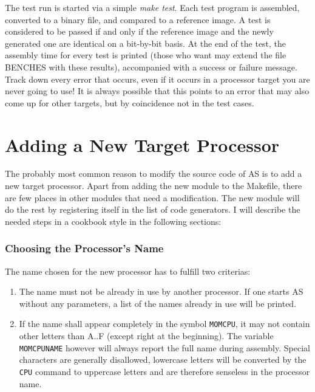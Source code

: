 \documentclass[12pt,twoside]{report}
\newcommand{\tty}[1]{{\tt #1}}
\newcommand{\asname}{{AS}}
\begin{document}
The test run is started via a simple {\em make test}.  Each test program
is assembled, converted to a binary file, and compared to a reference
image.  A test is considered to be passed if and only if the reference
image and the newly generated one are identical on a bit-by-bit basis.  At
the end of the test, the assembly time for every test is printed (those
who want may extend the file BENCHES with these results), accompanied with
a success or failure message.  Track down every error that occurs, even if
it occurs in a processor target you are never going to use!  It is always
possible that this points to an error that may also come up for other
targets, but by coincidence not in the test cases.


\section{Adding a New Target Processor}

The probably most common reason to modify the source code of \asname{} is to add
a new target processor.   Apart from adding the new module to the
Makefile, there are few places in other modules that need a modification.
The new module will do the rest by registering itself in the list of code
generators.  I will describe the needed steps in a cookbook style in the
following sections:

\subsubsection{Choosing the Processor's Name}

The name chosen for the new processor has to fulfill two criterias:
\begin{enumerate}
\item{The name must not be already in use by another processor.  If one
      starts \asname{} without any parameters, a list of the names already in
      use will be printed.}
\item{If the name shall appear completely in the symbol \tty{MOMCPU}, it may
      not contain other letters than A..F (except right at the
      beginning).  The variable \tty{MOMCPUNAME} however will always report
      the full name during assembly.  Special characters are generally
      disallowed, lowercase letters will be converted by the \tty{CPU}
      command to uppercase letters and are therefore senseless in the
      processor name.}
\end{enumerate}
\end{document}
